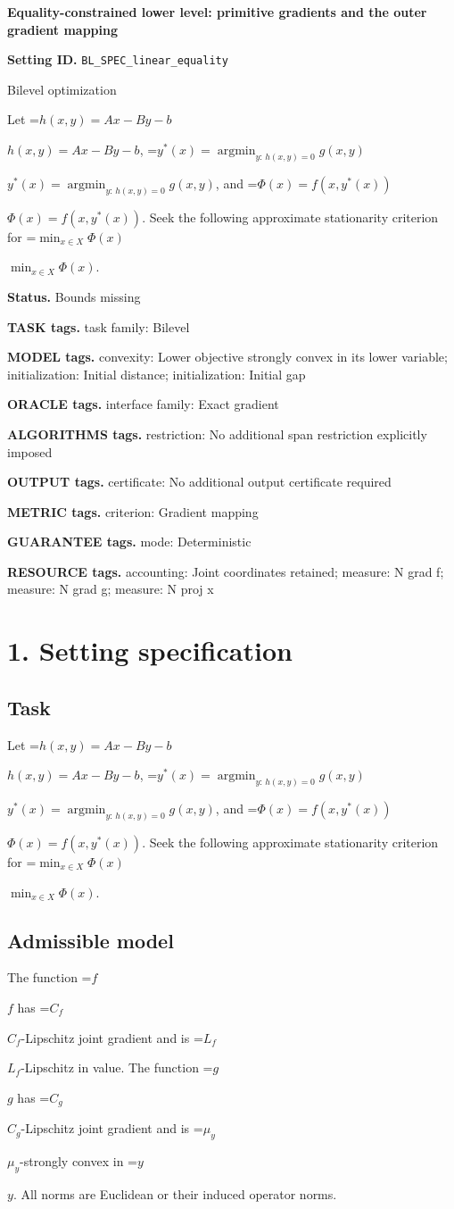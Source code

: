 \documentclass[10pt,a4paper]{article}
\newcommand{\AtlasMath}[1]{\par\begingroup\centering\setbox0=\hbox{$\displaystyle #1$}\ifdim\wd0>1.4\linewidth\typeout{ATLAS WIDE FORMULA: \the\wd0}\fi\ifdim\wd0>\linewidth\resizebox{\linewidth}{!}{\box0}\else\box0\fi\par\endgroup}
\newcommand{\AtlasInlineMath}[1]{\begingroup\setbox0=\hbox{$#1$}\ifdim\wd0>.4\linewidth\endgroup\AtlasMath{#1}\else\endgroup$#1$\fi}
\begin{document}
\raggedright

{\LARGE\bfseries\sffamily\color{AtlasNavy} Equality-constrained lower level: primitive gradients and the outer gradient mapping\par}\vspace{5pt}
\textbf{Setting ID.} \texttt{BL\_\allowbreak{}SPEC\_\allowbreak{}linear\_\allowbreak{}equality}

Bilevel optimization

Let \AtlasInlineMath{h(x,y)=Ax-By-b}, \AtlasInlineMath{y^*(x)=\operatorname*{argmin}_{y:\,h(x,y)=0}g(x,y)}, and \AtlasInlineMath{\Phi(x)=f(x,y^*(x))}. Seek the following approximate stationarity criterion for \AtlasInlineMath{\min_{x\in X}\Phi(x)}.

\textbf{Status.} Bounds missing

\textbf{TASK tags.} task family: Bilevel

\textbf{MODEL tags.} convexity: Lower objective strongly convex in its lower variable; initialization: Initial distance; initialization: Initial gap

\textbf{ORACLE tags.} interface family: Exact gradient

\textbf{ALGORITHMS tags.} restriction: No additional span restriction explicitly imposed

\textbf{OUTPUT tags.} certificate: No additional output certificate required

\textbf{METRIC tags.} criterion: Gradient mapping

\textbf{GUARANTEE tags.} mode: Deterministic

\textbf{RESOURCE tags.} accounting: Joint coordinates retained; measure: N grad f; measure: N grad g; measure: N proj x

\section{1. Setting specification}
\subsection{Task}
Let \AtlasInlineMath{h(x,y)=Ax-By-b}, \AtlasInlineMath{y^*(x)=\operatorname*{argmin}_{y:\,h(x,y)=0}g(x,y)}, and \AtlasInlineMath{\Phi(x)=f(x,y^*(x))}. Seek the following approximate stationarity criterion for \AtlasInlineMath{\min_{x\in X}\Phi(x)}.

\subsection{Admissible model}
The function \AtlasInlineMath{f} has \AtlasInlineMath{C_f}-Lipschitz joint gradient and is \AtlasInlineMath{L_f}-Lipschitz in value. The function \AtlasInlineMath{g} has \AtlasInlineMath{C_g}-Lipschitz joint gradient and is \AtlasInlineMath{\mu_y}-strongly convex in \AtlasInlineMath{y}. All norms are Euclidean or their induced operator norms.
\end{document}
